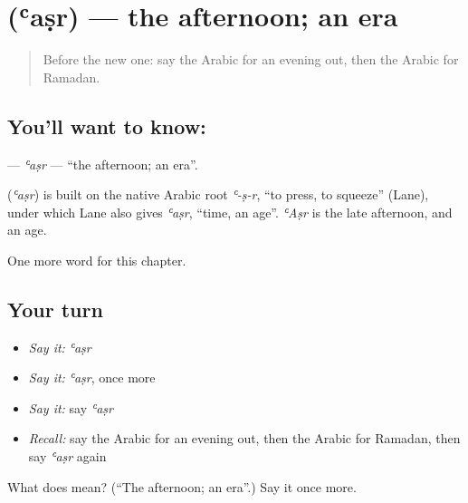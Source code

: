 \section[\texorpdfstring{\ar{عصر} (ʿaṣr)}{عصر (ʿaṣr)}]{ (ʿaṣr) — the afternoon; an era}

\label{lesson:AR-C264-asr}



\begin{quote}
Before the new one: say the Arabic for an evening out, then the Arabic for Ramadan.
\end{quote}

\subsection*{You'll want to know: }
\textbf{} — \emph{ʿaṣr} — \textquotedblleft{}the afternoon; an era\textquotedblright{}.

\begin{cousinweb}
\textbf{} (\emph{ʿaṣr}) is built on the native Arabic root \emph{ʿ-ṣ-r}, \textquotedblleft{}to press, to squeeze\textquotedblright{} (Lane), under which Lane also gives \emph{ʿaṣr}, \textquotedblleft{}time, an age\textquotedblright{}. \emph{ʿAṣr} is the late afternoon, and an age.
\end{cousinweb}

\begin{grammarlens}[title={What you've built}]
One more word for this chapter.
\end{grammarlens}

\subsection*{Your turn}
\begin{itemize}
\raggedright
  \item \emph{Say it:} \emph{ʿaṣr}
  \item \emph{Say it:} \emph{ʿaṣr}, once more
  \item \emph{Say it:} say \emph{ʿaṣr}
  \item \emph{Recall:} say the Arabic for an evening out, then the Arabic for Ramadan, then say \emph{ʿaṣr} again
\end{itemize}

\begin{tcolorbox}[breakable,colback=teal!4,colframe=teal!35!black,title={Before you move on}]
What does  mean? (\textquotedblleft{}The afternoon; an era\textquotedblright{}.) Say it once more.
\end{tcolorbox}
